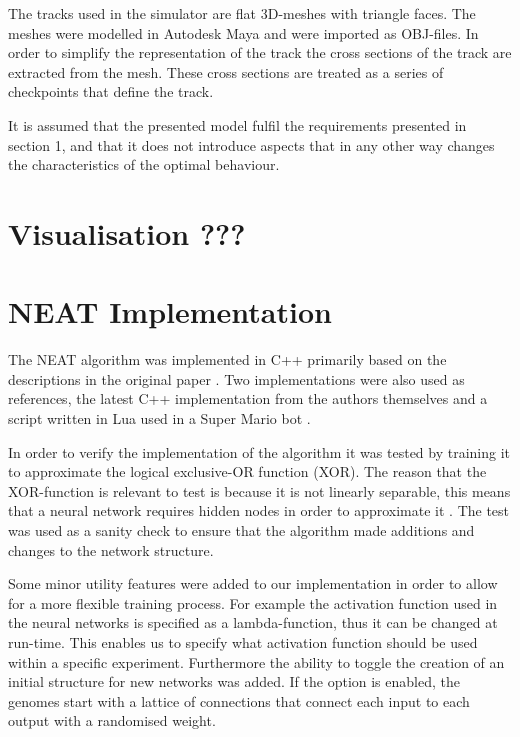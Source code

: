 The tracks used in the simulator are flat 3D-meshes with triangle faces. The meshes were modelled in Autodesk Maya and were imported as OBJ-files. In order to simplify the representation of the track the cross sections of the track are extracted from the mesh. These cross sections are treated as a series of checkpoints that define the track.  

It is assumed that the presented model fulfil the requirements presented in section 1, and that it does not introduce aspects that in any other way changes the characteristics of the optimal behaviour.

\section{Visualisation ???}

\section{NEAT Implementation}

The NEAT algorithm was implemented in C++ primarily based on the descriptions in the original paper \cite{stanley:neat}. Two implementations were also used as references, the latest C++ implementation from the authors themselves \cite{neat_source} and a script written in Lua used in a Super Mario bot \cite{mario_source}. 

In order to verify the implementation of the algorithm it was tested by training it to approximate the logical exclusive-OR function (XOR). The reason that the XOR-function is relevant to test is because it is not linearly separable, this means that a neural network requires  hidden nodes  in order to approximate it \cite{haykin:xor, stanley:neat}. The test was used as a sanity check to ensure that the algorithm made additions and changes to the network structure. 

Some minor utility features were added to our implementation in order to allow for a more flexible training process. For example the activation function used in the neural networks is specified as a lambda-function, thus it can be changed at run-time. This enables us to specify what activation function should be used within a specific experiment. Furthermore the ability to toggle the creation of an initial structure for new networks was added. If the option is enabled, the genomes start with a lattice of connections that connect each input to each output with a randomised weight. 


